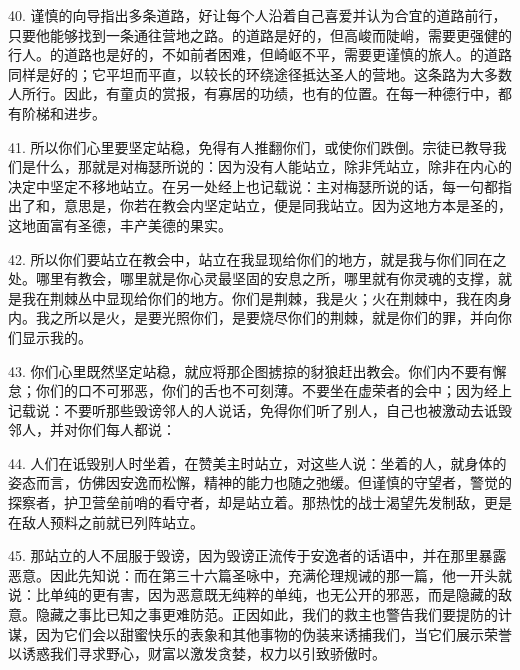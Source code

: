 40. 谨慎的向导指出多条道路，好让每个人沿着自己喜爱并认为合宜的道路前行，只要他能够找到一条通往营地之路。的道路是好的，但高峻而陡峭，需要更强健的行人。的道路也是好的，不如前者困难，但崎岖不平，需要更谨慎的旅人。的道路同样是好的；它平坦而平直，以较长的环绕途径抵达圣人的营地。这条路为大多数人所行。因此，有童贞的赏报，有寡居的功绩，也有的位置。在每一种德行中，都有阶梯和进步。\par

41. 所以你们心里要坚定站稳，免得有人推翻你们，或使你们跌倒。宗徒已教导我们是什么，那就是对梅瑟所说的：因为没有人能站立，除非凭站立，除非在内心的决定中坚定不移地站立。在另一处经上也记载说：主对梅瑟所说的话，每一句都指出了和，意思是，你若在教会内坚定站立，便是同我站立。因为这地方本是圣的，这地面富有圣德，丰产美德的果实。\par

42. 所以你们要站立在教会中，站立在我显现给你们的地方，就是我与你们同在之处。哪里有教会，哪里就是你心灵最坚固的安息之所，哪里就有你灵魂的支撑，就是我在荆棘丛中显现给你们的地方。你们是荆棘，我是火；火在荆棘中，我在肉身内。我之所以是火，是要光照你们，是要烧尽你们的荆棘，就是你们的罪，并向你们显示我的。\par

43. 你们心里既然坚定站稳，就应将那企图掳掠的豺狼赶出教会。你们内不要有懈怠；你们的口不可邪恶，你们的舌也不可刻薄。不要坐在虚荣者的会中；因为经上记载说：不要听那些毁谤邻人的人说话，免得你们听了别人，自己也被激动去诋毁邻人，并对你们每人都说：\par

44. 人们在诋毁别人时坐着，在赞美主时站立，对这些人说：坐着的人，就身体的姿态而言，仿佛因安逸而松懈，精神的能力也随之弛缓。但谨慎的守望者，警觉的探察者，护卫营垒前哨的看守者，却是站立着。那热忱的战士渴望先发制敌，更是在敌人预料之前就已列阵站立。\par

45.  那站立的人不屈服于毁谤，因为毁谤正流传于安逸者的话语中，并在那里暴露恶意。因此先知说：而在第三十六篇圣咏中，充满伦理规诫的那一篇，他一开头就说：比单纯的更有害，因为恶意既无纯粹的单纯，也无公开的邪恶，而是隐藏的敌意。隐藏之事比已知之事更难防范。正因如此，我们的救主也警告我们要提防的计谋，因为它们会以甜蜜快乐的表象和其他事物的伪装来诱捕我们，当它们展示荣誉以诱惑我们寻求野心，财富以激发贪婪，权力以引致骄傲时。\par

